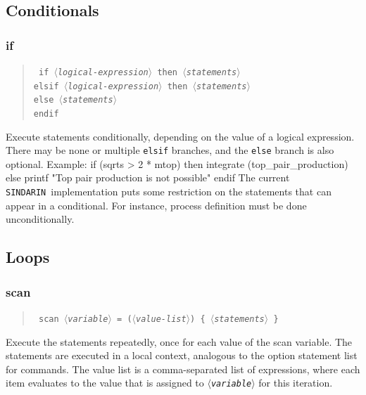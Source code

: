 \documentclass[12pt]{book}
\newenvironment{code}%
  {\begingroup\footnotesize
   \quote
   \verbatim}%
  {\endverbatim
   \endquote
   \endgroup\noindent}
\newenvironment{syntax}%
  {\begin{quote}
   \begin{flushleft}\tt}%
  {\end{flushleft}
   \end{quote}}
\newcommand{\var}[1]{$\langle$\textit{#1}$\rangle$}
\newcommand{\ttt}[1]{\texttt{#1}}
\newcommand{\sindarin}{\texttt{SINDARIN}}
\begin{document}
\subsection{Conditionals}

\subsubsection{if}
\begin{syntax}
if \var{logical-expression} then \var{statements} \\
elsif \var{logical-expression} then \var{statements} \\
else \var{statements} \\
endif
\end{syntax}
Execute statements conditionally, depending on the value of a logical
expression. There may be none or multiple \ttt{elsif} branches, and
the \ttt{else} branch is also optional.  Example:
\begin{code}
if (sqrts > 2 * mtop) then
  integrate (top_pair_production)
else
  printf "Top pair production is not possible"
endif
\end{code}
The current \sindarin\ implementation puts some restriction on the
statements that can appear in a conditional.  For instance, process
definition must be done unconditionally.

\subsection{Loops}
\subsubsection{scan}
\begin{syntax}
scan \var{variable} = (\var{value-list}) \{ \var{statements} \}
\end{syntax}
Execute the statements repeatedly, once for each value of the scan
variable.  The statements are executed in a local context, analogous
to the option statement list for commands.  The value list is a
comma-separated list of expressions, where each item evaluates to the
value that is assigned to \ttt{\var{variable}} for this iteration.
\end{document}
